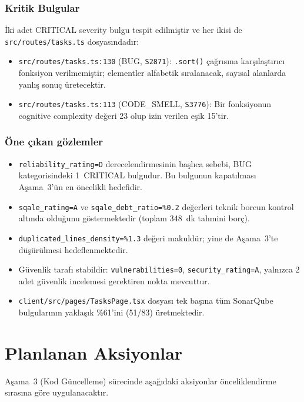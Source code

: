 \documentclass[conference]{IEEEtran}
\begin{document}
\subsubsection{Kritik Bulgular}
İki adet CRITICAL severity bulgu tespit edilmiştir ve her ikisi de
\texttt{src/routes/tasks.ts} dosyasındadır:

\begin{itemize}
\item \texttt{src/routes/tasks.ts:130} (BUG, \texttt{S2871}):
  \texttt{.sort()} çağrısına karşılaştırıcı fonksiyon verilmemiştir;
  elementler alfabetik sıralanacak, sayısal alanlarda yanlış sonuç
  üretecektir.
\item \texttt{src/routes/tasks.ts:113} (CODE\_SMELL, \texttt{S3776}):
  Bir fonksiyonun cognitive complexity değeri 23 olup izin verilen
  eşik 15'tir.
\end{itemize}

\subsubsection{Öne çıkan gözlemler}
\begin{itemize}
\item \texttt{reliability\_rating=D} derecelendirmesinin başlıca sebebi,
  BUG kategorisindeki 1~CRITICAL bulgudur. Bu bulgunun kapatılması
  Aşama~3'ün en öncelikli hedefidir.
\item \texttt{sqale\_rating=A} ve \texttt{sqale\_debt\_ratio=\%0.2}
  değerleri teknik borcun kontrol altında olduğunu göstermektedir
  (toplam 348~dk tahmini borç).
\item \texttt{duplicated\_lines\_density=\%1.3} değeri makuldür; yine de
  Aşama~3'te düşürülmesi hedeflenmektedir.
\item Güvenlik tarafı stabildir: \texttt{vulnerabilities=0},
  \texttt{security\_rating=A}, yalnızca 2 adet güvenlik incelemesi
  gerektiren nokta mevcuttur.
\item \texttt{client/src/pages/TasksPage.tsx} dosyası tek başına
  tüm SonarQube bulgularının yaklaşık \%61'ini (51/83) üretmektedir.
\end{itemize}

\section{Planlanan Aksiyonlar}

Aşama~3 (Kod Güncelleme) sürecinde aşağıdaki aksiyonlar önceliklendirme
sırasına göre uygulanacaktır.
\end{document}

